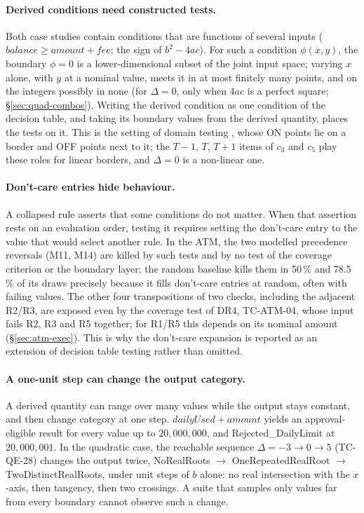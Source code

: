 \documentclass[11pt,a4paper]{article}
\begin{document}
\paragraph{Derived conditions need constructed tests.} Both case studies
contain conditions that are functions of several inputs
(\(\mathit{balance}\ge\mathit{amount}+\mathit{fee}\); the sign of
\(b^2-4ac\)). For such a condition \(\phi(x,y)\), the boundary \(\phi=0\) is
a lower-dimensional subset of the joint input space; varying \(x\) alone,
with \(y\) at a nominal value, meets it in at most finitely many points, and on the integers possibly in none (for \(\Delta=0\), only when \(4ac\) is a perfect square; \S\ref{sec:quad-combos}). Writing the derived condition as one
condition of the decision table, and taking its boundary values from the
derived quantity, places the tests on it. This is the setting of domain
testing \cite{whitecohen1980}, whose ON points lie on a border and OFF
points next to it; the \(T-1\), \(T\), \(T+1\) items of \(c_3\) and \(c_5\) play
these roles for linear borders, and \(\Delta=0\) is a non-linear one.

\paragraph{Don't-care entries hide behaviour.} A collapsed rule asserts that
some conditions do not matter. When that assertion rests on an evaluation
order, testing it requires setting the don't-care entry to the value that
would select another rule. In the ATM, the two modelled precedence reversals
(M11, M14) are killed by such tests and by no test of the coverage criterion
or the boundary layer; the random baseline kills them in 50\,\% and
78.5\,\% of its draws precisely because it fills don't-care entries at
random, often with failing values. The other four transpositions of two checks, including the adjacent R2/R3, are exposed even by the coverage test of DR4, TC-ATM-04, whose input fails R2, R3 and R5 together; for R1/R5 this depends on its nominal amount (\S\ref{sec:atm-exec}). This is why the don't-care expansion is reported as an extension of decision table testing rather than omitted.

\paragraph{A one-unit step can change the output category.} A derived
quantity can range over many values while the output stays constant, and
then change category at one step. \(\mathit{dailyUsed}+\mathit{amount}\)
yields an approval-eligible result for every value up to
\(20{,}000{,}000\), and Rejected\_DailyLimit at \(20{,}000{,}001\). In the
quadratic case, the reachable sequence \(\Delta=-3\to0\to5\) (TC-QE-28)
changes the output twice, NoRealRoots \(\to\) OneRepeatedRealRoot \(\to\)
TwoDistinctRealRoots, under unit steps of \(b\) alone: no real intersection
with the \(x\)-axis, then tangency, then two crossings. A suite that samples
only values far from every boundary cannot observe such a change.
\end{document}
